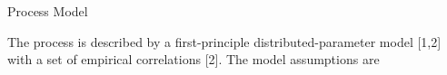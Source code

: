 \documentclass[a0,portrait]{a0poster}
\begin{document}
\begin{multicols}{2}





\begin{tcolorbox}[width=\linewidth, boxrule=0mm, sharp corners=all, colback=white]
	{\LARGE Process Model\\}
	
	The process is described by a first-principle distributed-parameter model [1,2] with a set of empirical correlations [2]. The model assumptions are \\
	

\end{tcolorbox}
\end{multicols}
\end{document}

